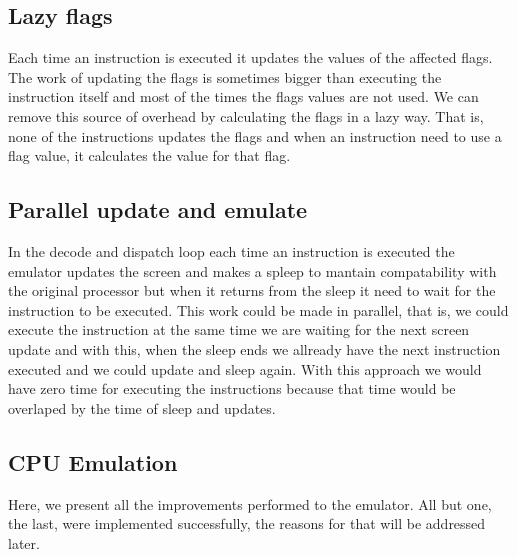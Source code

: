 \subsection{Lazy flags}
Each time an instruction is executed it updates the values of the affected flags. The work of updating the flags is sometimes bigger than executing the instruction itself and most of the times the flags values are not used. We can remove this source of overhead by calculating the flags in a lazy way. That is, none of the instructions updates the flags and when an instruction need to use a flag value, it calculates the value for that flag.

\subsection{Parallel update and emulate}
In the decode and dispatch loop each time an instruction is executed the emulator updates the screen and makes a spleep to mantain compatability with the original processor but when it returns from the sleep it need to wait for the instruction to be executed. This work could be made in parallel, that is, we could execute the instruction at the same time we are waiting for the next screen update and with this, when the sleep ends we allready have the next instruction executed and we could update and sleep again. With this approach we would have zero time for executing the instructions because that time would be overlaped by the time of sleep and updates.

\subsection{CPU Emulation}
Here, we present all the improvements performed to the emulator. All but one, the last, were implemented successfully, the reasons for that will be addressed later.

